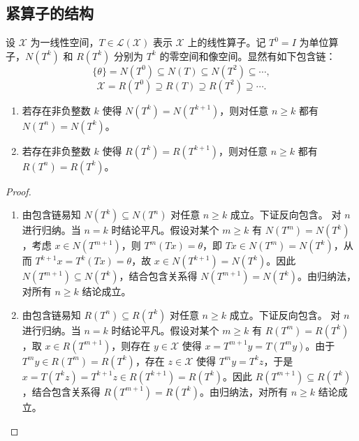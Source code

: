 \documentclass[../../main.tex]{subfiles}%
\begin{document}
\subsection{紧算子的结构}

\begin{proposition}
设 $\mathscr{X}$ 为一线性空间，$T \in \mathscr{L}(\mathscr{X})$ 表示 $\mathscr{X}$ 上的线性算子。记 $T^0 = I$ 为单位算子，$N(T^k)$ 和 $R(T^k)$ 分别为 $T^k$ 的零空间和像空间。显然有如下包含链：
\[
\{\theta\} = N(T^0) \subseteq N(T) \subseteq N(T^2) \subseteq \cdots,
\]
\[
\mathscr{X} = R(T^0) \supseteq R(T) \supseteq R(T^2) \supseteq \cdots.
\]
\begin{enumerate}[(1)]
\item 若存在非负整数 $k$ 使得 $N(T^k) = N(T^{k+1})$，则对任意 $n \geqslant k$ 都有 $N(T^n) = N(T^k)$。

\item 若存在非负整数 $k$ 使得 $R(T^k) = R(T^{k+1})$，则对任意 $n \geqslant k$ 都有 $R(T^n) = R(T^k)$。
\end{enumerate}
\end{proposition}
\begin{proof}
\begin{enumerate}[(1)]
\item 由包含链易知 $N(T^k) \subseteq N(T^n)$ 对任意 $n \geqslant k$ 成立。下证反向包含。
对 $n$ 进行归纳。当 $n=k$ 时结论平凡。假设对某个 $m \geqslant k$ 有 $N(T^m) = N(T^k)$，考虑 $x \in N(T^{m+1})$，则 $T^m(Tx) = \theta$，即 $Tx \in N(T^m) = N(T^k)$，从而 $T^{k+1}x = T^k(Tx) = \theta$，故 $x \in N(T^{k+1}) = N(T^k)$。因此 $N(T^{m+1}) \subseteq N(T^k)$，结合包含关系得 $N(T^{m+1}) = N(T^k)$。由归纳法，对所有 $n \geqslant k$ 结论成立。

\item 由包含链易知 $R(T^n) \subseteq R(T^k)$ 对任意 $n \geqslant k$ 成立。下证反向包含。
对 $n$ 进行归纳。当 $n=k$ 时结论平凡。假设对某个 $m \geqslant k$ 有 $R(T^m) = R(T^k)$，取 $x \in R(T^{m+1})$，则存在 $y \in \mathscr{X}$ 使得 $x = T^{m+1}y = T(T^m y)$。由于 $T^m y \in R(T^m) = R(T^k)$，存在 $z \in \mathscr{X}$ 使得 $T^m y = T^k z$，于是 $x = T(T^k z) = T^{k+1}z \in R(T^{k+1}) = R(T^k)$。因此 $R(T^{m+1}) \subseteq R(T^k)$，结合包含关系得 $R(T^{m+1}) = R(T^k)$。由归纳法，对所有 $n \geqslant k$ 结论成立。
\end{enumerate}
\end{proof}
\end{document}
